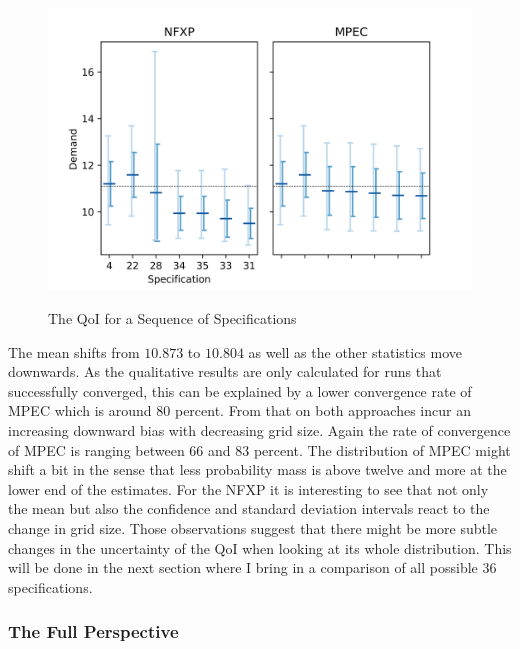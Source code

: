 \begin{figure}[!t]
	\caption{The QoI for a Sequence of Specifications}
	\vspace*{-4mm}
	\centering
	\includegraphics[scale=0.9]{../figures/figure_9.png}
	\label{figure9}
\end{figure}

The mean shifts from $10.873$ to $10.804$ as well as the other statistics move downwards. As the qualitative results are only calculated for runs that successfully converged, this can be explained by a lower convergence rate of MPEC which is around 80 percent. From that on both approaches incur an increasing downward bias with decreasing grid size. Again the rate of convergence of MPEC is ranging between 66 and 83 percent. The distribution of MPEC might shift a bit in the sense that less probability mass is above twelve and more at the lower end of the estimates. For the NFXP it is interesting to see that not only the mean but also the confidence and standard deviation intervals react to the change in grid size. Those observations suggest that there might be more subtle changes in the uncertainty of the QoI when looking at its whole distribution. This will be done in the next section where I bring in a comparison of all possible 36 specifications.

\subsubsection{The Full Perspective}

